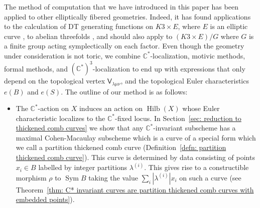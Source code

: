 \documentclass[12pt]{amsart}
\theoremstyle{definition}
\newcommand{\CC} {\mathbb{C}}          %
\newcommand{\sfV}{\mathsf{V}}
\newcommand{\Sym}{\operatorname{Sym}}
\newcommand{\Hilb}{\operatorname{Hilb}}
\begin{document}
The method of computation that we have introduced in this paper has
been applied to other elliptically fibered geometries. Indeed, it has
found applications to the calculation of DT generating functions on
$K3 \times E$, where $E$ is an elliptic curve \cite{Bryan-K3xE}, to
abelian threefolds \cite{BOPY}, and should also apply to $(K3\times
E)/G$ where $G$ is a finite group acting symplectically on each
factor. Even though the geometry under consideration is not toric, we
combine $\CC^*$-localization, motivic methods, formal methods, and
$(\CC^{*})^{3}$-localization to end up with expressions that only
depend on the topological vertex $\sfV_{\lambda\mu\nu}$, and the
topological Euler characteristics $e(B)$ and $e(S)$. The outline of
our method is as follows:
\begin{itemize}
\item The $\CC^{*}$-action on $X$ induces an action on $\Hilb (X)$
whose Euler characteristic localizes to the $\CC^{*}$-fixed locus.  In
Section~\ref{sec: reduction to thickened comb curves} we show that any
$\CC^{*}$-invariant subscheme has a maximal Cohen-Macaulay subscheme
which is a curve of a special form which we call a partition thickened
comb curve (Definition~\ref{defn: partition thickened comb
curve}). This curve is determined by data consisting of points
$x_{i}\in B$ labelled by integer partitions $\lambda^{(i)}$. This
gives rise to a constructible morphism $\rho$ to $\Sym B$ taking the
value $\sum_{i} |\lambda^{(i)}|x_{i}$ on such a curve (see
Theorem~\ref{thm: C* invariant curves are partition thickened comb
curves with embedded points}).



\end{itemize}
\end{document}
